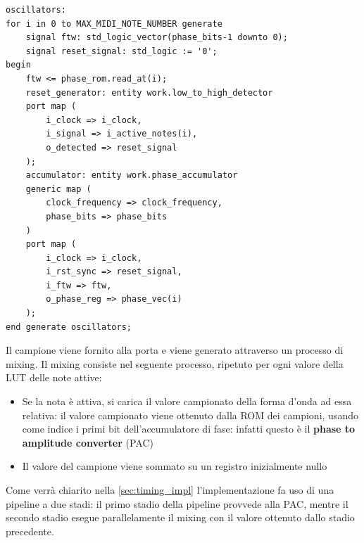 \begin{verbatim}
oscillators:
for i in 0 to MAX_MIDI_NOTE_NUMBER generate
    signal ftw: std_logic_vector(phase_bits-1 downto 0);
    signal reset_signal: std_logic := '0';
begin
    ftw <= phase_rom.read_at(i);
    reset_generator: entity work.low_to_high_detector
    port map (
        i_clock => i_clock,
        i_signal => i_active_notes(i),
        o_detected => reset_signal
    );
    accumulator: entity work.phase_accumulator
    generic map (
        clock_frequency => clock_frequency,
        phase_bits => phase_bits
    )
    port map (
        i_clock => i_clock,
        i_rst_sync => reset_signal,
        i_ftw => ftw,
        o_phase_reg => phase_vec(i)
    );
end generate oscillators;
\end{verbatim}

Il campione viene fornito alla porta  e viene generato attraverso un processo di mixing.
Il mixing consiste nel seguente processo, ripetuto per ogni valore della LUT delle note attive:
\begin{itemize}
    \item Se la nota è attiva, si carica il valore campionato della forma d'onda ad essa relativa:
          il valore campionato viene ottenuto dalla ROM dei campioni, usando come indice
          i primi  bit dell'accumulatore di fase: infatti questo è il
          \textbf{phase to amplitude converter} (PAC)
    \item Il valore del campione viene sommato su un registro inizialmente nullo
\end{itemize} 

Come verrà chiarito nella \cref{sec:timing_impl}
l'implementazione fa uso di una pipeline a due stadi:
il primo stadio della pipeline provvede alla PAC, mentre il secondo stadio
esegue parallelamente il mixing con il valore ottenuto dallo stadio
precedente.

